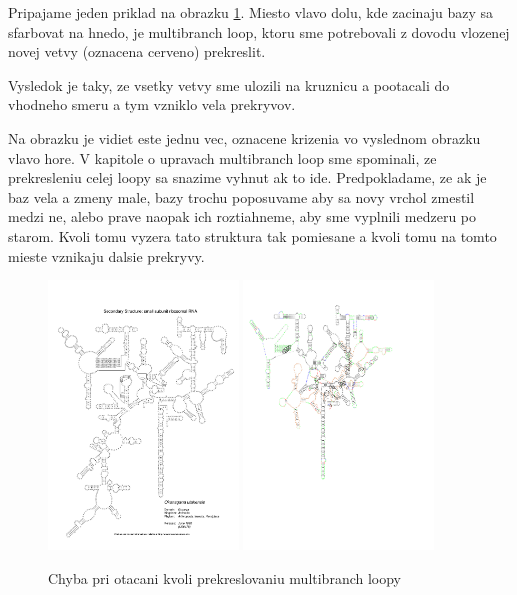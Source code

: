 Pripajame jeden priklad na obrazku \ref{obr:chyba_rotacia_multibranch}. Miesto vlavo dolu, kde zacinaju
bazy sa sfarbovat na hnedo, je multibranch loop, ktoru sme potrebovali z dovodu vlozenej novej vetvy
(oznacena cerveno) prekreslit.

Vysledok je taky, ze vsetky vetvy sme ulozili na kruznicu a pootacali do vhodneho smeru a tym vzniklo
vela prekryvov.

Na obrazku je vidiet este jednu vec, oznacene krizenia vo vyslednom obrazku vlavo hore.
V kapitole o upravach multibranch loop sme spominali, ze prekresleniu celej loopy sa snazime
vyhnut ak to ide. Predpokladame, ze ak je baz vela a zmeny male, bazy trochu poposuvame aby sa
novy vrchol zmestil medzi ne, alebo prave naopak ich roztiahneme, aby sme vyplnili medzeru po starom.
Kvoli tomu vyzera tato struktura tak pomiesane a kvoli tomu na tomto mieste vznikaju dalsie prekryvy.

\begin{figure}
  \includegraphics[width=0.45\textwidth]{../img/chyby/cicadas}
  \includegraphics[clip, trim=0.5cm 7cm 4cm 2cm,width=0.45\textwidth]{../img/chyby/cicadas-sea_scallop}
  \caption{Chyba pri otacani kvoli prekreslovaniu multibranch loopy}
  \label{obr:chyba_rotacia_multibranch}
\end{figure}









